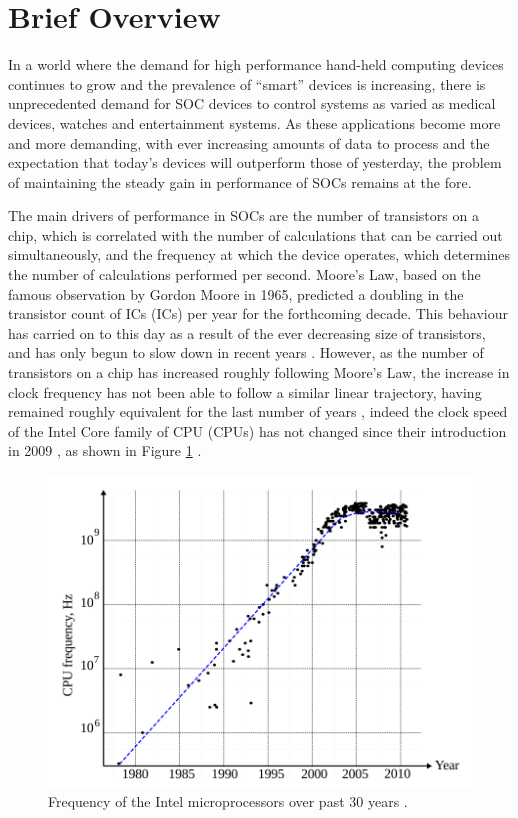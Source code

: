\section{Brief Overview}
In a world where the demand for high performance hand-held computing devices continues to grow and the prevalence of ``smart'' devices is increasing, there is unprecedented demand for \ac{SOC} devices to control systems as varied as medical devices, watches and entertainment systems.
As these applications become more and more demanding, with ever increasing amounts of data to process and the expectation that today's devices will outperform those of yesterday, the problem of maintaining the steady gain in performance of \acp{SOC} remains at the fore.

The main drivers of performance in \acp{SOC} are the number of transistors on a chip, which is correlated with the number of calculations that can be carried out simultaneously, and the frequency at which the device operates, which determines the number of calculations performed per second.
Moore's Law, based on the famous observation by Gordon Moore in 1965\cite{moore1965cramming}, predicted a doubling in the transistor count of \aclp{IC} (\acsp{IC}) per year for the forthcoming decade. This behaviour has carried on to this day as a result of the ever decreasing size of transistors, and has only begun to slow down in recent years \cite{ross2008cpu}.
However, as the number of transistors on a chip has increased roughly following Moore's Law, the increase in clock frequency has not been able to follow a similar linear trajectory, having remained roughly equivalent for the last number of years \cite{ross2008cpu}, indeed the clock speed of the Intel Core family of \acl{CPU} (\acs{CPU}s) has not changed since their introduction in 2009 \cite{intelark}, as shown in Figure \ref{fig:eldar_last_30_yrs}
.
\begin{figure}[h]
	\centering
	\includegraphics[scale=0.4]{../eldar_last_30_yrs}
	\caption[Frequency of the Intel microprocessors over past 30 years]{Frequency of the Intel microprocessors over past 30 years \cite{zianbetov2013phd}.}
	\label{fig:eldar_last_30_yrs}
\end{figure}\\
